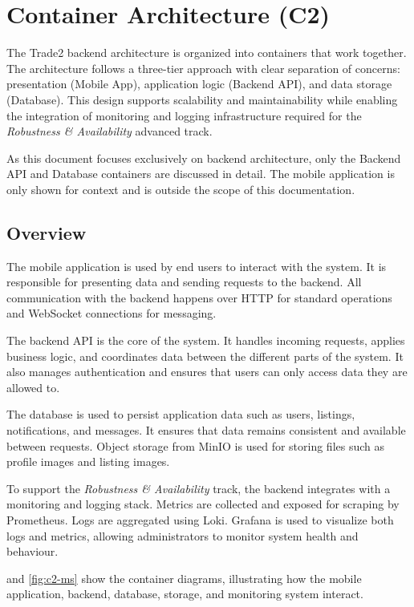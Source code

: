 \section{Container Architecture (C2)}
The Trade2 backend architecture is organized into containers that work together.
The architecture follows a three-tier approach with clear separation of concerns: presentation (Mobile App), application logic (Backend API), and data storage (Database).
This design supports scalability and maintainability while enabling the integration of monitoring and logging infrastructure required for the \emph{Robustness \& Availability} advanced track.

As this document focuses exclusively on backend architecture, only the Backend API and Database containers are discussed in detail.
The mobile application is only shown for context and is outside the scope of this documentation.

\subsection{Overview}
The mobile application is used by end users to interact with the system.
It is responsible for presenting data and sending requests to the backend.
All communication with the backend happens over HTTP for standard operations and WebSocket connections for messaging.

The backend API is the core of the system.
It handles incoming requests, applies business logic, and coordinates data between the different parts of the system.
It also manages authentication and ensures that users can only access data they are allowed to.

The database is used to persist application data such as users, listings, notifications, and messages.
It ensures that data remains consistent and available between requests.
Object storage from MinIO is used for storing files such as profile images and listing images.

To support the \emph{Robustness \& Availability} track, the backend integrates with a monitoring and logging stack.
Metrics are collected and exposed for scraping by Prometheus.
Logs are aggregated using Loki.
Grafana is used to visualize both logs and metrics, allowing administrators to monitor system health and behaviour.

 and \cref{fig:c2-ms} show the container diagrams, illustrating how the mobile application, backend, database, storage, and monitoring system interact.

